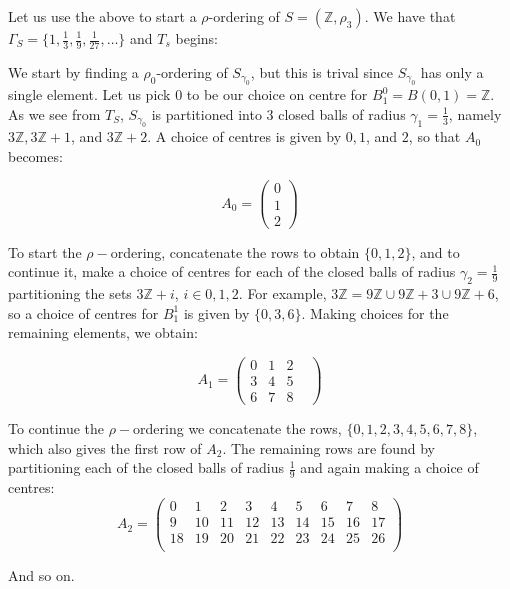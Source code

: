 \begin{example}
Let us use the above to start a $\rho$-ordering of $S=(\mathbb{Z}, \rho_3)$. We have that $\Gamma_S=\{1, \frac{1}{3},\frac{1}{9},\frac{1}{27},\ldots \}$ and $T_s$ begins:

\begin{center}
\end{center}




We start by finding a $\rho_0$-ordering of $S_{\gamma_0}$, but this is trival since $S_{\gamma_0}$ has only a single element. Let us pick $0$ to be our choice on centre for $B^0_1=B(0,1)=\mathbb{Z}$. As we see from $T_S$, $S_{\gamma_0}$ is partitioned into $3$ closed balls of radius $\gamma_1=\frac{1}{3}$, namely $3\mathbb{Z}, 3\mathbb{Z}+1$, and $3\mathbb{Z}+2$. A choice of centres is given by $0,1$, and $2$, so that $A_0$ becomes:

\[A_0=
 \begin{pmatrix}
0 \\
1  \\
2 
\end{pmatrix}
\]


To start the $\rho-$ordering, concatenate the rows to obtain $\{0,1,2\}$, and to continue it, make a choice of centres for each of the closed balls of radius $\gamma_2=\frac{1}{9}$ partitioning the sets $3\mathbb{Z}+i$, $i \in 0,1,2$. For example, $3\mathbb{Z} =  9\mathbb{Z} \cup 9\mathbb{Z}+3 \cup 9\mathbb{Z}+6$, so a choice of centres for $B^1_1$ is given by $\{0,3,6\}$. Making choices for the remaining elements, we obtain: 

\[A_1=
 \begin{pmatrix}
0 & 1 &  2 & \\
3 & 4 &  5 & \\
6 & 7 &  8 &
\end{pmatrix}
\]

To continue the $\rho-$ordering we concatenate the rows, $\{0,1,2,3,4,5,6,7,8\}$, which also gives the first row of $A_2$. The remaining rows are found by partitioning each of the closed balls of radius $\frac{1}{9}$ and again making a choice of centres:
\[A_2=
 \begin{pmatrix}
0 & 1 &  2 & 3 & 4 & 5 & 6 & 7 & 8 \\
9 & 10 &  11 & 12 & 13 & 14 & 15 & 16 & 17 \\
18 & 19 &  20 & 21 & 22 & 23 & 24 & 25 & 26 \\
\end{pmatrix}
\]

And so on. 
\end{example}

